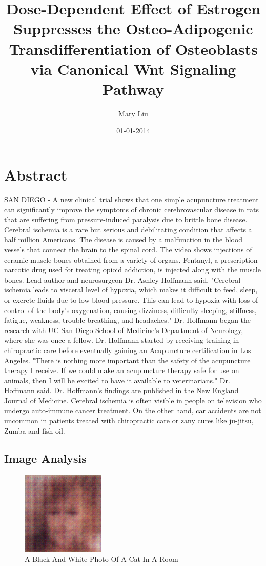 \documentclass{article}%
\title{Dose{-}Dependent Effect of Estrogen Suppresses the Osteo{-}Adipogenic Transdifferentiation of Osteoblasts via Canonical Wnt Signaling Pathway}%
\author{Mary Liu}%
\affil{Oncology Research, Pfizer Worldwide Research and Development, San Diego, California, United States of America}%
\date{01{-}01{-}2014}%
\begin{document}
%
\normalsize%
\maketitle%
\section{Abstract}%
\label{sec:Abstract}%
SAN DIEGO {-} A new clinical trial shows that one simple acupuncture treatment can significantly improve the symptoms of chronic cerebrovascular disease in rats that are suffering from pressure{-}induced paralysis due to brittle bone disease.\newline%
Cerebral ischemia is a rare but serious and debilitating condition that affects a half million Americans. The disease is caused by a malfunction in the blood vessels that connect the brain to the spinal cord.\newline%
The video shows injections of ceramic muscle bones obtained from a variety of organs. Fentanyl, a prescription narcotic drug used for treating opioid addiction, is injected along with the muscle bones.\newline%
Lead author and neurosurgeon Dr. Ashley Hoffmann said, "Cerebral ischemia leads to visceral level of hypoxia, which makes it difficult to feed, sleep, or excrete fluids due to low blood pressure. This can lead to hypoxia with loss of control of the body's oxygenation, causing dizziness, difficulty sleeping, stiffness, fatigue, weakness, trouble breathing, and headaches."\newline%
Dr. Hoffmann began the research with UC San Diego School of Medicine's Department of Neurology, where she was once a fellow. Dr. Hoffmann started by receiving training in chiropractic care before eventually gaining an Acupuncture certification in Los Angeles.\newline%
"There is nothing more important than the safety of the acupuncture therapy I receive. If we could make an acupuncture therapy safe for use on animals, then I will be excited to have it available to veterinarians." Dr. Hoffmann said.\newline%
Dr. Hoffmann's findings are published in the New England Journal of Medicine.\newline%
Cerebral ischemia is often visible in people on television who undergo auto{-}immune cancer treatment. On the other hand, car accidents are not uncommon in patients treated with chiropractic care or zany cures like ju{-}jitsu, Zumba and fish oil.

%
\subsection{Image Analysis}%
\label{subsec:ImageAnalysis}%


\begin{figure}[h!]%
\centering%
\includegraphics[width=150px]{500_fake_images/samples_5_195.png}%
\caption{A Black And White Photo Of A Cat In A Room}%
\end{figure}

%
\end{document}
